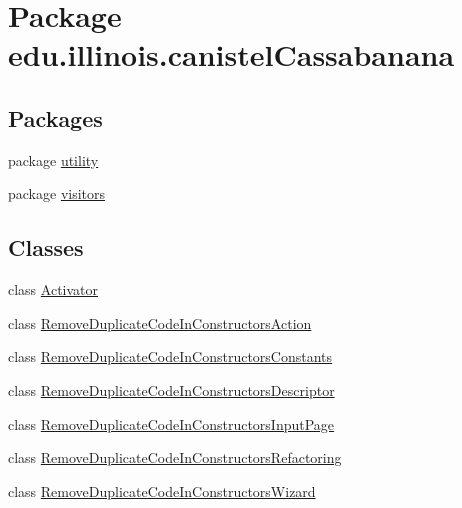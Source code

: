\hypertarget{namespaceedu_1_1illinois_1_1canistelCassabanana}{
\section{Package edu.illinois.canistelCassabanana}
\label{namespaceedu_1_1illinois_1_1canistelCassabanana}
}
\subsection*{Packages}
\begin{DoxyCompactItemize}
\item 
package \hyperlink{namespaceedu_1_1illinois_1_1canistelCassabanana_1_1utility}{utility}
\item 
package \hyperlink{namespaceedu_1_1illinois_1_1canistelCassabanana_1_1visitors}{visitors}
\end{DoxyCompactItemize}
\subsection*{Classes}
\begin{DoxyCompactItemize}
\item 
class \hyperlink{classedu_1_1illinois_1_1canistelCassabanana_1_1Activator}{Activator}
\item 
class \hyperlink{classedu_1_1illinois_1_1canistelCassabanana_1_1RemoveDuplicateCodeInConstructorsAction}{RemoveDuplicateCodeInConstructorsAction}
\item 
class \hyperlink{classedu_1_1illinois_1_1canistelCassabanana_1_1RemoveDuplicateCodeInConstructorsConstants}{RemoveDuplicateCodeInConstructorsConstants}
\item 
class \hyperlink{classedu_1_1illinois_1_1canistelCassabanana_1_1RemoveDuplicateCodeInConstructorsDescriptor}{RemoveDuplicateCodeInConstructorsDescriptor}
\item 
class \hyperlink{classedu_1_1illinois_1_1canistelCassabanana_1_1RemoveDuplicateCodeInConstructorsInputPage}{RemoveDuplicateCodeInConstructorsInputPage}
\item 
class \hyperlink{classedu_1_1illinois_1_1canistelCassabanana_1_1RemoveDuplicateCodeInConstructorsRefactoring}{RemoveDuplicateCodeInConstructorsRefactoring}
\item 
class \hyperlink{classedu_1_1illinois_1_1canistelCassabanana_1_1RemoveDuplicateCodeInConstructorsWizard}{RemoveDuplicateCodeInConstructorsWizard}
\end{DoxyCompactItemize}

